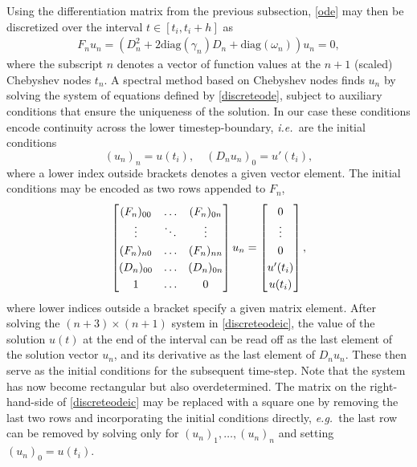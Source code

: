 \documentclass[10pt]{article}
\newcommand{\be}{\begin{equation}}
\newcommand{\ee}{\end{equation}}
\newcommand{\ie}{{\it i.e.\ }}
\newcommand{\eg}{{\it e.g.\ }}
\newcommand{\om}{\omega}
\newcommand{\g}{\gamma}
\begin{document}
Using the differentiation matrix from the previous subsection,
\cref{ode} may then be discretized over the interval $t \in [t_i, t_i+h]$ as
\begin{align}\label{discreteode}
    F_n u_n = \left(D_n^2 + 2\text{diag}(\g_n)D_n + \text{diag}(\om_n) \right)u_n = 0, 
\end{align}
where the subscript $n$ denotes a vector of function values at the $n+1$ (scaled) Chebyshev nodes $t_n$.
A spectral method based on Chebyshev nodes finds $u_n$ by solving the system of
equations defined by \cref{discreteode}, subject to auxiliary conditions that
ensure the uniqueness of the solution. In our case these conditions encode
continuity across the lower timestep-boundary, \ie are the initial conditions
\be\label{discreteic}
(u_n)_n = u(t_i), \quad \left(D_nu_n\right)_0 = u'(t_i),
\ee
where a lower index outside brackets denotes a given vector element.
The initial conditions may be encoded as two rows appended to $F_n$,
\be\label{discreteodeic}
\renewcommand*{\arraystretch}{1.25}
\begin{bmatrix}
    (F_n)_{00} & \ldots & (F_n)_{0n} \\
    \vdots & \ddots & \vdots \\
    (F_n)_{n0} & \ldots & (F_n)_{nn} \\
    (D_n)_{00} & \ldots & (D_n)_{0n} \\
    1 & \ldots & 0
\end{bmatrix}
u_n =  
\begin{bmatrix}
0 \\
\vdots \\
0 \\
u'(t_i) \\
u(t_i)
\end{bmatrix},
\ee
where lower indices outside a bracket specify a given matrix element.
After solving the $(n+3) \times (n+1)$ system in \cref{discreteodeic}, the value of the solution
$u(t)$ at the end of the interval can be read off as the last element of the
solution vector $u_n$, and its derivative as the last element of $D_nu_n$.
These then serve as the initial conditions for the subsequent time-step.
Note that the system has now become rectangular but also overdetermined. The
matrix on the right-hand-side of \cref{discreteodeic} may be replaced with a
square one by removing the last two rows and incorporating the initial
conditions directly, \eg the last row can be removed by solving only for
$(u_n)_1, \ldots, (u_n)_n$ and setting $(u_n)_0 = u(t_i)$.
\end{document}
